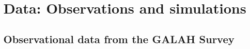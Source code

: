 \documentclass[fleqn,usenatbib]{mnras}
\begin{document}
\section{Data: Observations and simulations} \label{sec:data}

\subsection{Observational data from the GALAH Survey}\label{sec:obs_data}


\end{document}
